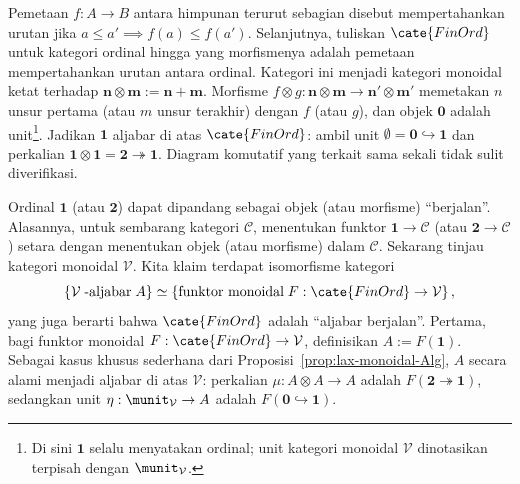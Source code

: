 \begin{catatan}\label{rem:walking-algebra}
	Pemetaan $f:A\to B$ antara himpunan terurut sebagian disebut
	mempertahankan urutan jika
	$a\leq a'\implies f(a)\leq f(a')$. Selanjutnya, tuliskan $\cate{FinOrd}$
	untuk kategori ordinal hingga yang morfismenya adalah pemetaan
	mempertahankan urutan antara ordinal. Kategori ini menjadi kategori
	monoidal ketat terhadap
	$\mathbf{n}\otimes\mathbf{m}:=\mathbf{n}+\mathbf{m}$. Morfisme
	$f\otimes g:\mathbf{n}\otimes\mathbf{m}\to\mathbf{n}'\otimes\mathbf{m}'$
	memetakan $n$ unsur pertama (atau $m$ unsur terakhir) dengan $f$ (atau $g$),
	dan objek $\mathbf{0}$ adalah unit\footnote{Di sini $\mathbf{1}$ selalu
	menyatakan ordinal; unit kategori monoidal $\mathcal{V}$ dinotasikan terpisah
	dengan $\munit_{\mathcal{V}}$.}. Jadikan $\mathbf{1}$ aljabar di atas
	$\cate{FinOrd}$: ambil unit $\emptyset=\mathbf{0}\hookrightarrow\mathbf{1}$
	dan perkalian
	$\mathbf{1}\otimes\mathbf{1}=\mathbf{2}\twoheadrightarrow\mathbf{1}$.
	Diagram komutatif yang terkait sama sekali tidak sulit diverifikasi.
	
	Ordinal $\mathbf{1}$ (atau $\mathbf{2}$) dapat dipandang sebagai objek
	(atau morfisme) ``berjalan''. Alasannya, untuk sembarang kategori
	$\mathcal{C}$, menentukan funktor $\mathbf{1}\to\mathcal{C}$ (atau
	$\mathbf{2}\to\mathcal{C}$) setara dengan menentukan objek (atau morfisme)
	dalam $\mathcal{C}$. Sekarang tinjau kategori monoidal $\mathcal{V}$. Kita
	klaim terdapat isomorfisme kategori
	\[
		\left\{ \mathcal{V}\;\text{-aljabar}\; A \right\} \simeq \left\{ \text{funktor monoidal}\; F: \cate{FinOrd} \to \mathcal{V} \right\},
	\]
	yang juga berarti bahwa $\cate{FinOrd}$ adalah ``aljabar berjalan''.
	Pertama, bagi funktor monoidal
	$F:\cate{FinOrd}\to\mathcal{V}$, definisikan $A:=F(\mathbf{1})$. Sebagai
	kasus khusus sederhana dari Proposisi~\ref{prop:lax-monoidal-Alg}, $A$
	secara alami menjadi aljabar di atas $\mathcal{V}$: perkalian
	$\mu:A\otimes A\to A$ adalah $F(\mathbf{2}\twoheadrightarrow\mathbf{1})$,
	sedangkan unit $\eta:\munit_{\mathcal{V}}\to A$ adalah
	$F(\mathbf{0}\hookrightarrow\mathbf{1})$.
	

\end{catatan}
